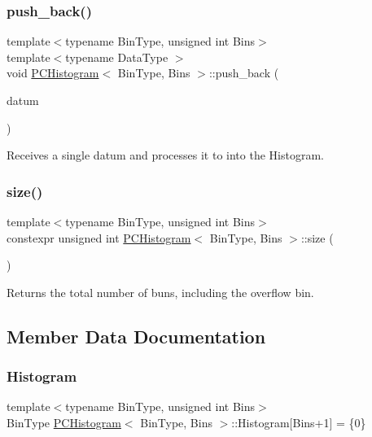 \subsubsection{\texorpdfstring{push\+\_\+back()}{push\_back()}}
{\footnotesize\ttfamily template$<$typename Bin\+Type, unsigned int Bins$>$ \\
template$<$typename Data\+Type $>$ \\
void \hyperlink{classPCHistogram}{P\+C\+Histogram}$<$ Bin\+Type, Bins $>$\+::push\+\_\+back (\begin{DoxyParamCaption}\item[{Data\+Type}]{datum }\end{DoxyParamCaption})\hspace{0.3cm}{\ttfamily [inline]}}



Receives a single datum and processes it to into the Histogram. 

\mbox{\label{classPCHistogram_a4c7558c7cebdd928c0b6e0c548baf1b9}} 
\subsubsection{\texorpdfstring{size()}{size()}}
{\footnotesize\ttfamily template$<$typename Bin\+Type, unsigned int Bins$>$ \\
constexpr unsigned int \hyperlink{classPCHistogram}{P\+C\+Histogram}$<$ Bin\+Type, Bins $>$\+::size (\begin{DoxyParamCaption}{ }\end{DoxyParamCaption})\hspace{0.3cm}{\ttfamily [inline]}}



Returns the total number of buns, including the overflow bin. 



\subsection{Member Data Documentation}
\mbox{\label{classPCHistogram_a239c7b1e34b2ecc1808e2304d71bc1e2}} 
\subsubsection{\texorpdfstring{Histogram}{Histogram}}
{\footnotesize\ttfamily template$<$typename Bin\+Type, unsigned int Bins$>$ \\
Bin\+Type \hyperlink{classPCHistogram}{P\+C\+Histogram}$<$ Bin\+Type, Bins $>$\+::Histogram\mbox{[}Bins+1\mbox{]} = \{0\}}



